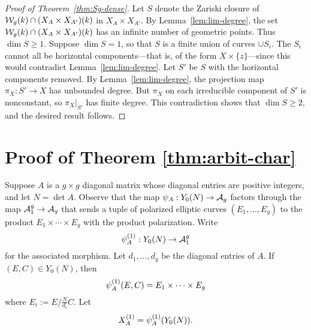 \documentclass{amsart}
\begin{document}
\begin{proof}[Proof of Theorem~\ref{thm:Sg-dense}]
  Let $S$ denote the Zariski closure of $\mathcal{W}_g(k) \cap (X_A \times X_{A'})(k)$ in $X_A \times X_{A'}$. By Lemma~\ref{lem:lim-degree}, the set $\mathcal{W}_g(k) \cap (X_A \times X_{A'})(k)$ has an infinite number of geometric points. Thus $\dim S \geq 1$. Suppose $\dim S = 1$, so that $S$ is a finite union of curves $\cup S_i$. The $S_i$ cannot all be horizontal components---that is, of the form $X \times \{z\}$---since this would contradict Lemma~\ref{lem:lim-degree}. Let $S'$ be $S$ with the horizontal components removed. By Lemma~\ref{lem:lim-degree}, the projection map $\pi_X: S' \to X$ has unbounded degree. But $\pi_X$ on each irreducible component of $S'$ is nonconstant, so $\pi_X|_{S'}$ has finite degree. This contradiction shows that $\dim S \geq 2$, and the desired result follows.
\end{proof}







\section{Proof of Theorem \ref{thm:arbit-char}}
\label{sec:characteristic-p}



Suppose $A$ is a $g \times g$ diagonal matrix whose diagonal entries are positive integers, and let $N = \det A$. Observe that the map $\psi_{A}: Y_0(N) \to \mathcal{A}_g$ factors through the map $\mathcal{A}_1^g \to \mathcal{A}_g$ that sends a tuple of polarized elliptic curves $(E_1,\dots,E_g)$ to the product $E_1 \times \cdots \times E_g$ with the product polarization. Write
\[
\psi_{A}^{(1)}: Y_0(N) \to \mathcal{A}_1^g
\]
for the associated morphism. Let $d_1, \ldots, d_g$ be the diagonal entries of $A$. If $(E, C) \in Y_0(N)$, then
\[
  \psi_{A}^{(1)}(E,C) = E_1 \times \cdots \times E_g
\]
where  $E_i := E/\frac{N}{d_i}C$.
Let $$X^{(1)}_A = \psi_{A}^{(1)}(Y_0(N)).$$
\end{document}
